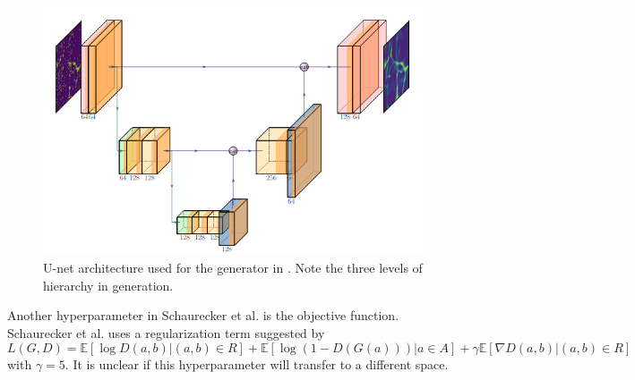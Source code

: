 \begin{figure}[h!]
  \includegraphics[width=\textwidth]{unet.png}
  \caption{U-net architecture used for the generator in \cite{superresolving-halos}. Note the three levels of hierarchy in generation.}
  \label{unet}
\end{figure}

Another hyperparameter in Schaurecker et al. is the objective function. Schaurecker et al. uses a regularization term suggested by \cite{GAN-regularization}
\[L(G, D) = \mathbb E [\log D(a, b) | (a, b) \in R] + \mathbb E [\log(1 - D(G(a))) | a \in A] + \gamma \mathbb E [\nabla D(a, b) | (a, b) \in R]\]
with \(\gamma = 5\). It is unclear if this hyperparameter will transfer to a different space.
